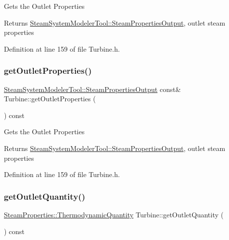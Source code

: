Gets the Outlet Properties

\begin{DoxyReturn}{Returns}
\hyperlink{struct_steam_system_modeler_tool_1_1_steam_properties_output}{Steam\+System\+Modeler\+Tool\+::\+Steam\+Properties\+Output}, outlet steam properties 
\end{DoxyReturn}


Definition at line 159 of file Turbine.\+h.

\mbox{\label{class_turbine_aa9449622449e78285a258823ff77c8ec}} 
\subsubsection{\texorpdfstring{get\+Outlet\+Properties()}{getOutletProperties()}\hspace{0.1cm}{\footnotesize\ttfamily [3/3]}}
{\footnotesize\ttfamily \hyperlink{struct_steam_system_modeler_tool_1_1_steam_properties_output}{Steam\+System\+Modeler\+Tool\+::\+Steam\+Properties\+Output} const\& Turbine\+::get\+Outlet\+Properties (\begin{DoxyParamCaption}{ }\end{DoxyParamCaption}) const\hspace{0.3cm}{\ttfamily [inline]}}

Gets the Outlet Properties

\begin{DoxyReturn}{Returns}
\hyperlink{struct_steam_system_modeler_tool_1_1_steam_properties_output}{Steam\+System\+Modeler\+Tool\+::\+Steam\+Properties\+Output}, outlet steam properties 
\end{DoxyReturn}


Definition at line 159 of file Turbine.\+h.

\mbox{\label{class_turbine_acd3e98ab67754b652de97498d9bec6d2}} 
\subsubsection{\texorpdfstring{get\+Outlet\+Quantity()}{getOutletQuantity()}\hspace{0.1cm}{\footnotesize\ttfamily [1/3]}}
{\footnotesize\ttfamily \hyperlink{class_steam_properties_ae0294bedf7d178c2d8fb6aed0f62fbff}{Steam\+Properties\+::\+Thermodynamic\+Quantity} Turbine\+::get\+Outlet\+Quantity (\begin{DoxyParamCaption}{ }\end{DoxyParamCaption}) const\hspace{0.3cm}{\ttfamily [inline]}}

